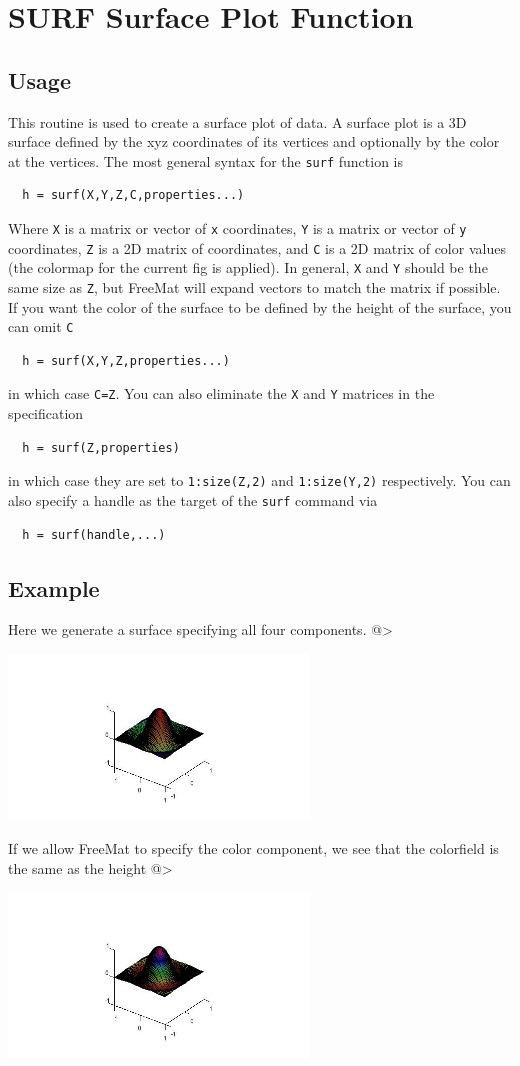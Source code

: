\section{SURF Surface Plot Function}

\subsection{Usage}

This routine is used to create a surface plot of data.  A 
surface plot is a 3D surface defined by the xyz coordinates
of its vertices and optionally by the color at the vertices.
The most general syntax for the \verb|surf| function is
\begin{verbatim}
  h = surf(X,Y,Z,C,properties...)
\end{verbatim}
Where \verb|X| is a matrix or vector of \verb|x| coordinates, \verb|Y| is a
matrix or vector of \verb|y| coordinates, \verb|Z| is a 2D matrix of
coordinates, and \verb|C| is a 2D matrix of color values (the colormap
for the current fig is applied).  In general, \verb|X| and \verb|Y| should
be the same size as \verb|Z|, but FreeMat will expand vectors to match
the matrix if possible.
If you want the color of the surface to be defined by the height
of the surface, you can omit \verb|C|
\begin{verbatim}
  h = surf(X,Y,Z,properties...)
\end{verbatim}
in which case \verb|C=Z|.  You can also eliminate the \verb|X| and \verb|Y|
matrices in the specification
\begin{verbatim}
  h = surf(Z,properties)
\end{verbatim}
in which case they are set to \verb|1:size(Z,2)| and \verb|1:size(Y,2)|
respectively.
You can also specify a handle as the target of the \verb|surf| command
via
\begin{verbatim}
  h = surf(handle,...)
\end{verbatim}
\subsection{Example}

Here we generate a surface specifying all four components.
@>


\centerline{\includegraphics[width=8cm]{surf1}}

If we allow FreeMat to specify the color component, we see that
the colorfield is the same as the height
@>


\centerline{\includegraphics[width=8cm]{surf2}}

